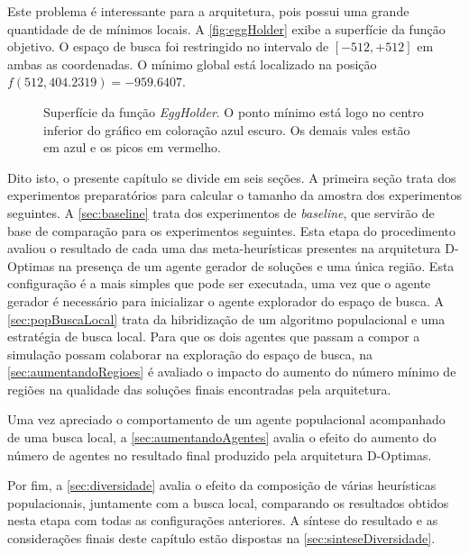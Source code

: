 Este problema é interessante para a arquitetura, pois possui uma grande quantidade de de mínimos locais. A \autoref{fig:eggHolder} exibe a superfície da função objetivo. O espaço de busca foi restringido no intervalo de $[-512,+512]$ em ambas as coordenadas. O mínimo global está localizado na posição $f(512, 404.2319) = -959.6407$.   

\begin{figure}
    \centering
    \caption{Superfície da função \textit{EggHolder}. O ponto mínimo está logo no centro inferior do gráfico em coloração azul escuro. Os demais vales estão em azul e os picos em vermelho.}
    
    \label{fig:eggHolder}
\end{figure}

Dito isto, o presente capítulo se divide em seis seções. A primeira seção trata dos experimentos preparatórios para calcular o tamanho da amostra dos experimentos seguintes. A \autoref{sec:baseline} trata dos experimentos de \textit{baseline}, que servirão de base de comparação para os experimentos seguintes. Esta etapa do procedimento avaliou o resultado de cada uma das meta-heurísticas presentes na arquitetura D-Optimas na presença de um agente gerador de soluções e uma única região. Esta configuração é a mais simples que pode ser executada, uma vez que o agente gerador é necessário para inicializar o agente explorador do espaço de busca. A \autoref{sec:popBuscaLocal} trata da hibridização de um algoritmo populacional e uma estratégia de busca local. Para que os dois agentes que passam a compor a simulação possam colaborar na exploração do espaço de busca, na \autoref{sec:aumentandoRegioes} é avaliado o impacto do aumento do número mínimo de regiões na qualidade das soluções finais encontradas pela arquitetura.

Uma vez apreciado o comportamento de um agente populacional acompanhado de uma busca local, a \autoref{sec:aumentandoAgentes} avalia o efeito do aumento do número de agentes no resultado final produzido pela arquitetura D-Optimas. 

Por fim, a \autoref{sec:diversidade} avalia o efeito da composição de várias heurísticas populacionais, juntamente com a busca local, comparando os resultados obtidos nesta etapa com todas as configurações anteriores. A síntese do resultado e as considerações finais deste capítulo estão dispostas na \autoref{sec:sinteseDiversidade}.

